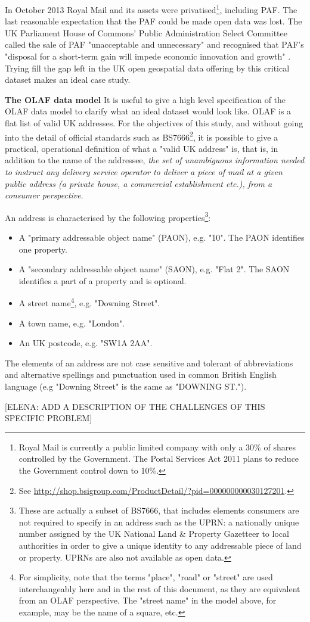 In October 2013 Royal Mail and its assets were privatised\footnote{Royal Mail is currently a public limited company with only a 30\% of shares controlled by the Government. The Postal Services Act 2011 \cite{postalserviceact2011} plans to reduce the Government control down to 10\%.}, including PAF. The last reasonable expectation that the PAF could be made open data was lost. The UK Parliament House of Commons' Public Administration Select Committee called the sale of PAF "unacceptable and unnecessary" and recognised that PAF's "disposal for a short-term gain will impede economic innovation and growth" \cite{pascod}. Trying fill the gap left in the UK open geospatial data offering by this critical dataset makes an ideal case study. 

\textbf{The OLAF data model} It is useful to give a high level specification of the OLAF data model to clarify what an ideal dataset would look like. OLAF is a flat list of valid UK addresses. For the objectives of this study, and without going into the detail of official standards such as BS7666\footnote{See \url{http://shop.bsigroup.com/ProductDetail/?pid=000000000030127201}.}, it is possible to give a practical, operational definition of what a "valid UK address" is, that is, in addition to the name of the addressee, {\it the set of unambiguous information needed to instruct any delivery service operator to deliver a piece of mail at a given public address (a private house, a commercial establishment etc.), from a consumer perspective}. 

An address is characterised by the following properties\footnote{These are actually a subset of BS7666, that includes elements consumers are not required to specify in an address such as the UPRN: a nationally unique number assigned by the UK National Land \& Property Gazetteer to local authorities in order to give a unique identity to any addressable piece of land or property. UPRNs are also not available as open data.}:

\begin{itemize}
    \item A "primary addressable object name" (PAON), e.g. "10". The PAON identifies one property.
    \item A "secondary addressable object name" (SAON), e.g. "Flat 2". The SAON identifies a part of a property and is optional.
    \item A street name\footnote{For simplicity, note that the terms "place", "road" or "street" are used interchangeably here and in the rest of this document, as they are equivalent from an OLAF perspective. The "street name" in the model above, for example, may be the name of a square, etc.}, e.g. "Downing Street".
    \item A town name, e.g. "London".
    \item An UK postcode, e.g. "SW1A 2AA".
\end{itemize}

The elements of an address are not case sensitive and tolerant of abbreviations and alternative spellings and punctuation used in common British English language (e.g "Downing Street" is the same as "DOWNING ST.").

[ELENA: ADD A DESCRIPTION OF THE CHALLENGES OF THIS SPECIFIC PROBLEM]

